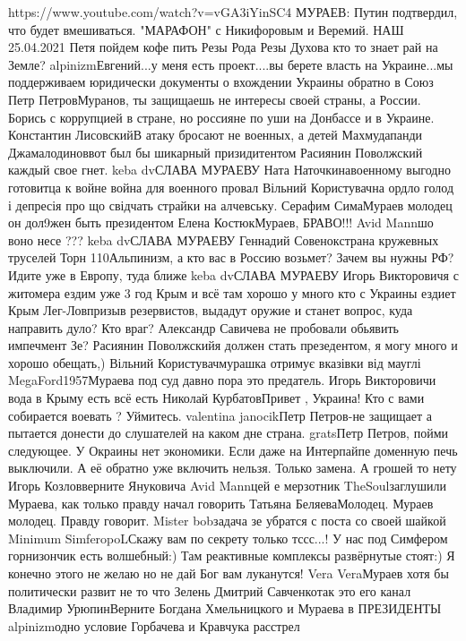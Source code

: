 https://www.youtube.com/watch?v=vGA3iYinSC4
МУРАЕВ: Путин подтвердил, что будет вмешиваться. "МАРАФОН" с Никифоровым и Веремий. НАШ 25.04.2021
Петя пойдем кофе пить
Резы Рода Резы Духов​а кто то знает рай на Земле?
alpinizm​Евгений...у меня есть проект....вы берете власть на Украине...мы поддерживаем юридически документы о вхождении Украины обратно в Союз
Петр Петров​Муранов, ты защищаешь не интересы своей страны, а России. Борись с коррупцией в стране, но россияне по уши на Донбассе и в Украине.
Константин Лисовский​В атаку бросают не военных, а детей
Махмудапанди Джамалодинов​вот был бы шикарный призидитентом
Расиянин Поволжский​каждый свое гнет.
keba dv​СЛАВА МУРАЕВУ
Ната Наточкина​военному выгодно готовитца к войне война для военного провал
Вільний Користувач​на ордло голод і депресія про що свідчать страйки на алчевську.
Серафим Сима​Мураев молодец он дол9жен быть президентом
Елена Костюк​Мураев, БРАВО!!!
Avid Mann​шо воно несе ???
keba dv​СЛАВА МУРАЕВУ
Геннадий Совенок​страна кружевных труселей
Торн 110​Альпинизм, а кто вас в Россию возьмет? Зачем вы нужны РФ? Идите уже в Европу, туда ближе
keba dv​СЛАВА МУРАЕВУ
Игорь Викторович​я с житомера ездим уже 3 год Крым и всё там хорошо у много кто с Украины ездиет Крым
Лег-Лов​призыв резервистов, выдадут оружие и станет вопрос, куда направить дуло? Кто враг?
Александр Савичев​а не пробовали обьявить импечмент Зе?
Расиянин Поволжский​я должен стать презедентом, я могу много и хорошо обещать,)
Вільний Користувач​мурашка отримує вказівки від мауглі
MegaFord1957​Мураева под суд давно пора это предатель.
Игорь Викторович​и вода в Крыму есть всё есть
Николай Курбатов​Привет , Украина! Кто с вами собирается воевать ? Уймитесь.
valentina janocik​Петр Петров-не защищает а пытается донести до слушателей на каком дне страна.
grats​Петр Петров, пойми следующее. У Окраины нет экономики. Если даже на Интерпайпе доменную печь выключили. А её обратно уже включить нельзя. Только замена. А грошей то нету
Игорь Козлов​верните Януковича
Avid Mann​цей е мерзотник
TheSoul​заглушили Мураева, как только правду начал говорить
Татьяна Беляева​Молодец. Мураев молодец. Правду говорит.
Mister bob​задача зе убратся с поста со своей шайкой
Minimum SimferopoL​Скажу вам по секрету только тссс...! У нас под Симфером горнизончик есть волшебный:) Там реактивные комплексы развёрнутые стоят:) Я конечно этого не желаю но не дай Бог вам луканутся!
Vera Vera​Мураев хотя бы политически развит не то что Зелень
Дмитрий Савченко​так это его канал
Владимир Урюпин​Верните Богдана Хмельницкого и Мураева в ПРЕЗИДЕНТЫ
alpinizm​одно условие Горбачева и Кравчука расстрел
